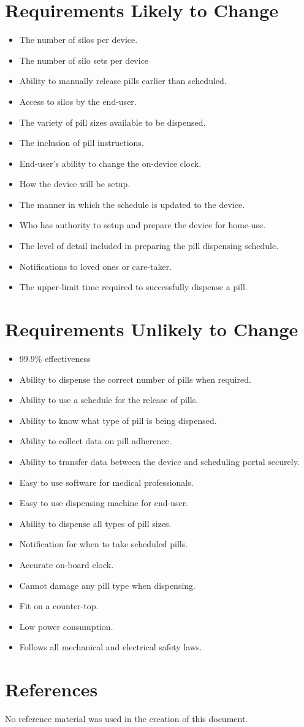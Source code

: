 \documentclass[12pt,titlepage]{article}
\begin{document}
\section{Requirements Likely to Change}
\begin{itemize}
    \item The number of silos per device.
    \item The number of silo sets per device
    \item Ability to manually release pills earlier than scheduled.
    \item Access to silos by the end-user.
    \item The variety of pill sizes available to be dispensed.
    \item The inclusion of pill instructions.
    \item End-user's ability to change the on-device clock.
    \item How the device will be setup.
    \item The manner in which the schedule is updated to the device.
    \item Who has authority to setup and prepare the device for home-use.
    \item The level of detail included in preparing the pill dispensing schedule.
    \item Notifications to loved ones or care-taker.
    \item The upper-limit time required to successfully dispense a pill.
\end{itemize}

\section{Requirements Unlikely to Change}
\begin{itemize}
    \item 99.9\% effectiveness
    \item Ability to dispense the correct number of pills when required.
    \item Ability to use a schedule for the release of pills.
    \item Ability to know what type of pill is being dispensed.
    \item Ability to collect data on pill adherence.
    \item Ability to transfer data between the device and scheduling portal securely.
    \item Easy to use software for medical professionals.
    \item Easy to use dispensing machine for end-user.
    \item Ability to dispense all types of pill sizes.
    \item Notification for when to take scheduled pills.
    \item Accurate on-board clock.
    \item Cannot damage any pill type when dispensing.
    \item Fit on a counter-top.
    \item Low power consumption.
    \item Follows all mechanical and electrical safety laws.
\end{itemize}
\section{References}
No reference material was used in the creation of this document.
\end{document}
